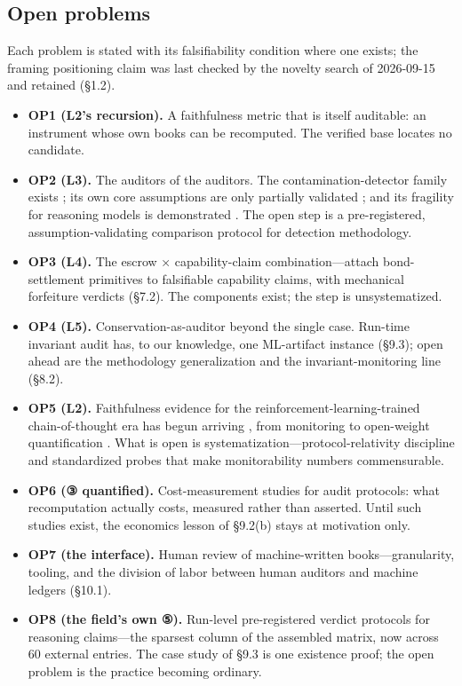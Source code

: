 \documentclass[11pt,a4paper]{article}
\begin{document}
\subsection{Open problems}

Each problem is stated with its falsifiability condition where one exists; the framing positioning claim was last checked by the novelty search of 2026-09-15 and retained (§1.2).

\begin{itemize}[leftmargin=1.6em]
\item \textbf{OP1 (L2's recursion).} A faithfulness metric that is itself auditable: an instrument whose own books can be recomputed. The verified base locates no candidate.
\item \textbf{OP2 (L3).} The auditors of the auditors. The contamination-detector family exists \cite{key36,key37,key38,key39,key40,key41}; its own core assumptions are only partially validated \cite{key39}; and its fragility for reasoning models is demonstrated \cite{key42}. The open step is a pre-registered, assumption-validating comparison protocol for detection methodology.
\item \textbf{OP3 (L4).} The escrow × capability-claim combination—attach bond-settlement primitives \cite{key48,key49,key50,key51} to falsifiable capability claims, with mechanical forfeiture verdicts (§7.2). The components exist; the step is unsystematized.
\item \textbf{OP4 (L5).} Conservation-as-auditor beyond the single case. Run-time invariant audit has, to our knowledge, one ML-artifact instance (§9.3); open ahead are the methodology generalization and the invariant-monitoring line (§8.2).
\item \textbf{OP5 (L2).} Faithfulness evidence for the reinforcement-learning-trained chain-of-thought era has begun arriving \cite{key29,key30,key31,key32,key34}, from monitoring \cite{key30} to open-weight quantification \cite{key32}. What is open is systematization—protocol-relativity discipline and standardized probes that make monitorability numbers commensurable.
\item \textbf{OP6 (③ quantified).} Cost-measurement studies for audit protocols: what recomputation actually costs, measured rather than asserted. Until such studies exist, the economics lesson of §9.2(b) stays at motivation only.
\item \textbf{OP7 (the interface).} Human review of machine-written books—granularity, tooling, and the division of labor between human auditors and machine ledgers (§10.1).
\item \textbf{OP8 (the field's own ⑤).} Run-level pre-registered verdict protocols for reasoning claims—the sparsest column of the assembled matrix, now across 60 external entries. The case study of §9.3 is one existence proof; the open problem is the practice becoming ordinary.
\end{itemize}
\end{document}
